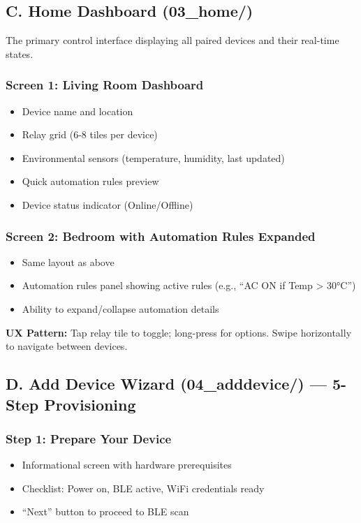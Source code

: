 \subsection{C. Home Dashboard (03\_home/)}

The primary control interface displaying all paired devices and their real-time states.

\subsubsection{Screen 1: Living Room Dashboard}
\begin{itemize}
    \item Device name and location
    \item Relay grid (6-8 tiles per device)
    \item Environmental sensors (temperature, humidity, last updated)
    \item Quick automation rules preview
    \item Device status indicator (Online/Offline)
\end{itemize}

\subsubsection{Screen 2: Bedroom with Automation Rules Expanded}
\begin{itemize}
    \item Same layout as above
    \item Automation rules panel showing active rules (e.g., ``AC ON if Temp > 30°C'')
    \item Ability to expand/collapse automation details
\end{itemize}

\textbf{UX Pattern:} Tap relay tile to toggle; long-press for options. Swipe horizontally to navigate between devices.

\subsection{D. Add Device Wizard (04\_adddevice/) — 5-Step Provisioning}

\subsubsection{Step 1: Prepare Your Device}
\begin{itemize}
    \item Informational screen with hardware prerequisites
    \item Checklist: Power on, BLE active, WiFi credentials ready
    \item ``Next'' button to proceed to BLE scan
\end{itemize}

